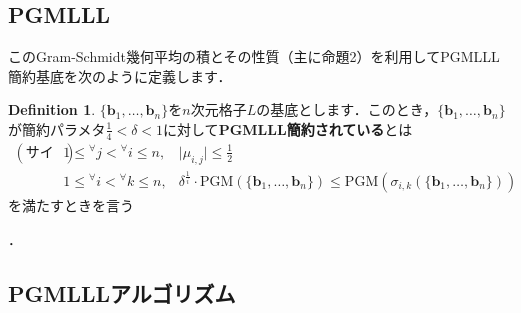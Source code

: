\documentclass[a4j, dvipdfmx]{jsarticle}
\theoremstyle{definition}
\newtheorem{definition}{Definition}[section]
\begin{document}
\subsection{PGMLLL}

このGram-Schmidt幾何平均の積とその性質（主に命題2）を利用してPGMLLL簡約基底を次のように定義します．

\begin{definition}
    $\lbrace\boldsymbol{b}_1,\ldots,\boldsymbol{b}_n\rbrace$を$n$次元格子$L$の基底とします．このとき，$\lbrace\boldsymbol{b}_1,\ldots,\boldsymbol{b}_n\rbrace$が簡約パラメタ$\frac{1}{4}<\delta<1$に対して\textbf{PGMLLL簡約されている}とは
    $$
    \begin{array}{lll}
    (\textbf{サイズ簡約条件})&1\le{}^\forall j<{}^\forall i\le n,&\lvert\mu_{i, j}\rvert\le \frac{1}{2}\\
    &1\le{}^\forall i<{}^\forall k\le n,&\delta^{\frac{1}{i}}\cdot \mathrm{PGM}(\lbrace\boldsymbol{b}_1,\ldots,\boldsymbol{b}_n\rbrace)\le\mathrm{PGM}(\sigma_{i, k}(\lbrace\boldsymbol{b}_1,\ldots,\boldsymbol{b}_n\rbrace))
    \end{array}
    $$
    を満たすときを言う
\end{definition}．

\subsection{PGMLLLアルゴリズム}
\end{document}
